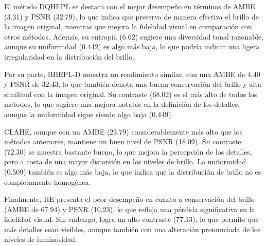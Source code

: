 \documentclass[sigchi]{acmart}
\begin{document}
El método DQHEPL se destaca con el mejor desempeño en términos de AMBE (3.31) y PSNR (32.79), lo que indica que preserva de manera efectiva el brillo de la imagen original, mientras
que mejora la fidelidad visual en comparación con otros métodos. Además, su entropía (6.62)
sugiere una diversidad tonal razonable, aunque su uniformidad (0.442) es algo más baja, lo que
podría indicar una ligera irregularidad en la distribución del brillo.

Por su parte, BHEPL-D muestra un rendimiento similar, con una AMBE de 4.40 y PSNR de 32.43,
lo que también denota una buena conservación del brillo y alta similitud con la imagen
original. Su contraste (68.02) es el más alto de todos los métodos, lo que sugiere una mejora
notable en la definición de los detalles, aunque la uniformidad sigue siendo algo baja (0.449).

CLAHE, aunque con un AMBE (23.79) considerablemente más alto que los métodos anteriores,
mantiene un buen nivel de PSNR (18.09). Su contraste (72.30) se muestra bastante bueno, lo
que mejora la percepción de los detalles, pero a costa de una mayor distorsión en los niveles
de brillo. La uniformidad (0.509) también es algo más baja, lo que indica que la distribución
de brillo no es completamente homogénea.

Finalmente, HE presenta el peor desempeño en cuanto a conservación del brillo (AMBE de 67.94) y
PSNR (10.23), lo que refleja una pérdida significativa en la fidelidad visual. Sin embargo,
logra un alto contraste (77.13), lo que permite que más detalles sean visibles, aunque también
con una alteración pronunciada de los niveles de luminosidad.
\end{document}
